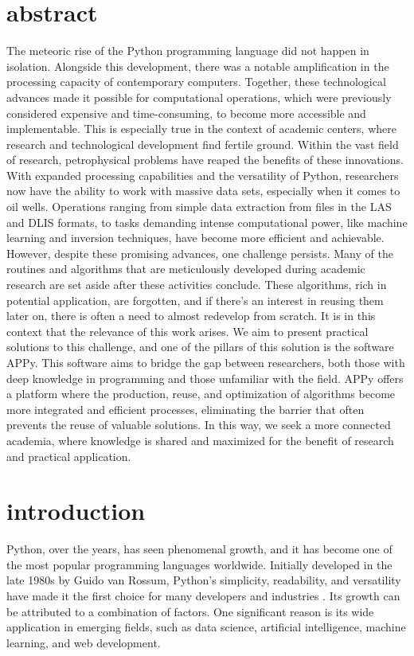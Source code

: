 \documentclass[10pt,twocolumn,twoside]{article}
\begin{document}
\section{abstract}
The meteoric rise of the Python programming language did not happen in isolation. Alongside this development, there was a notable amplification in the processing capacity of contemporary computers. Together, these technological advances made it possible for computational operations, which were previously considered expensive and time-consuming, to become more accessible and implementable. This is especially true in the context of academic centers, where research and technological development find fertile ground. Within the vast field of research, petrophysical problems have reaped the benefits of these innovations. With expanded processing capabilities and the versatility of Python, researchers now have the ability to work with massive data sets, especially when it comes to oil wells. Operations ranging from simple data extraction from files in the LAS and DLIS formats, to tasks demanding intense computational power, like machine learning and inversion techniques, have become more efficient and achievable. However, despite these promising advances, one challenge persists. Many of the routines and algorithms that are meticulously developed during academic research are set aside after these activities conclude. These algorithms, rich in potential application, are forgotten, and if there's an interest in reusing them later on, there is often a need to almost redevelop from scratch. It is in this context that the relevance of this work arises. We aim to present practical solutions to this challenge, and one of the pillars of this solution is the software APPy. This software aims to bridge the gap between researchers, both those with deep knowledge in programming and those unfamiliar with the field. APPy offers a platform where the production, reuse, and optimization of algorithms become more integrated and efficient processes, eliminating the barrier that often prevents the reuse of valuable solutions. In this way, we seek a more connected academia, where knowledge is shared and maximized for the benefit of research and practical application.


\section{introduction}
Python, over the years, has seen phenomenal growth, and it has become one of the most popular programming languages worldwide. Initially developed in the late 1980s by Guido van Rossum, Python's simplicity, readability, and versatility have made it the first choice for many developers and industries \citep{pysftw2021}. Its growth can be attributed to a combination of factors. One significant reason is its wide application in emerging fields, such as data science, artificial intelligence, machine learning, and web development.
\end{document}
